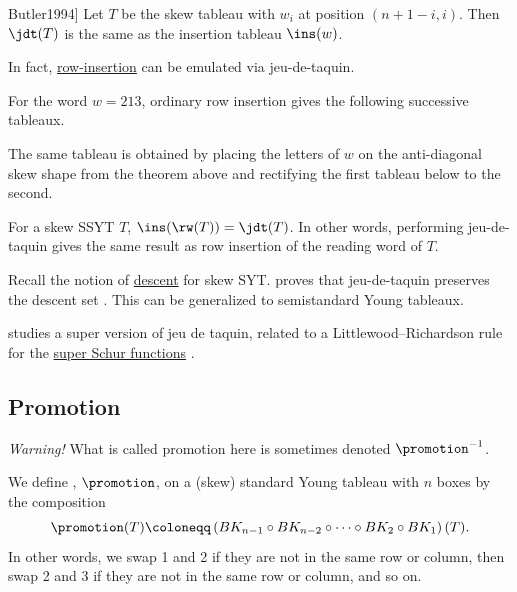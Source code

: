 \begin{theorem}[See \cite[Cor.~2.3.19]{Butler1994}]
Let $T$ be the skew tableau with $w_i$ at position $(n+1-i,i)$.
Then $\jdt(T)$ is the same as the insertion tableau $\ins(w)$.
\end{theorem}

In fact, \hyperref[rowInsertion]{row-insertion} can be emulated via jeu-de-taquin.

\begin{example*}
For the word $w=213$, ordinary row insertion gives the following successive
tableaux.
\begin{figure}
\end{figure}
The same tableau is obtained by placing the letters of $w$ on the
anti-diagonal skew shape from the theorem above and rectifying the first
tableau below to the second.
\begin{figure}
\end{figure}
\end{example*}

For a skew SSYT $T$, $\ins(\rw(T)) = \jdt(T)$.  In other words,
performing jeu-de-taquin gives the same result as row insertion of the
reading word of $T$.

Recall the notion of \hyperref[tableauDescentSet]{descent} for skew SYT.
 proves that jeu-de-taquin preserves the descent
set \cite[Lem.~3.2]{DoranIV1997}.
This can be generalized to semistandard Young tableaux.

 studies a super version of jeu de taquin, related to a
Littlewood--Richardson rule for the \hyperref[hookSchur]{super Schur functions}
\cite{Hage2022}.


\subsection[promotion]{Promotion}

\emph{Warning!} What is called promotion here is sometimes denoted $\promotion^{-1}$.

\bigskip

We define \label{tableauPromotion}, $\promotion$, on a
(skew) standard Young tableau with $n$ boxes by the composition
\[
\promotion(T) \coloneqq \left( BK_{n-1} \circ BK_{n-2} \circ \dotsm \circ BK_2 \circ BK_1 \right)(T).
\]
In other words, we swap 1 and 2 if they are not in the same row or column,
then swap 2 and 3 if they are not in the same row or column, and so on.

